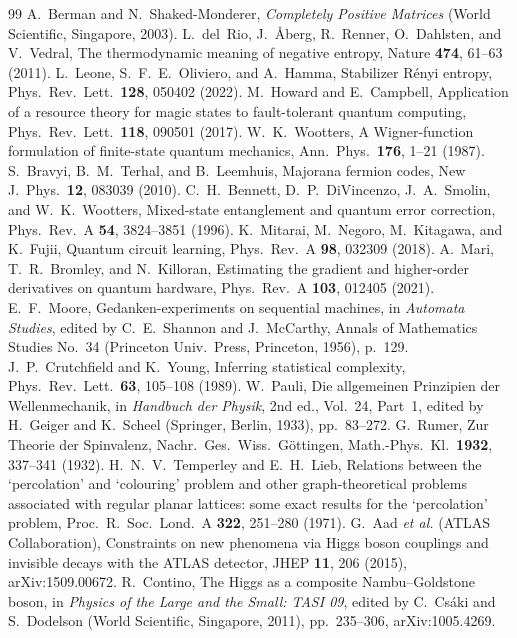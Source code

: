 \documentclass[aps,pra,onecolumn,superscriptaddress,nofootinbib,10pt]{revtex4-2}
\theoremstyle{definition}
\theoremstyle{remark}
\begin{document}
\begin{thebibliography}{99}
 A.~Berman and N.~Shaked-Monderer, \emph{Completely Positive Matrices} (World Scientific, Singapore, 2003).
 L.~del~Rio, J.~{\AA}berg, R.~Renner, O.~Dahlsten, and V.~Vedral, The thermodynamic meaning of negative entropy, Nature \textbf{474}, 61--63 (2011).
 L.~Leone, S.~F.~E.~Oliviero, and A.~Hamma, Stabilizer R\'enyi entropy, Phys.\ Rev.\ Lett.\ \textbf{128}, 050402 (2022).
 M.~Howard and E.~Campbell, Application of a resource theory for magic states to fault-tolerant quantum computing, Phys.\ Rev.\ Lett.\ \textbf{118}, 090501 (2017).
 W.~K.~Wootters, A Wigner-function formulation of finite-state quantum mechanics, Ann.\ Phys.\ \textbf{176}, 1--21 (1987).
 S.~Bravyi, B.~M.~Terhal, and B.~Leemhuis, Majorana fermion codes, New J.\ Phys.\ \textbf{12}, 083039 (2010).
 C.~H.~Bennett, D.~P.~DiVincenzo, J.~A.~Smolin, and W.~K.~Wootters, Mixed-state entanglement and quantum error correction, Phys.\ Rev.\ A \textbf{54}, 3824--3851 (1996).
 K.~Mitarai, M.~Negoro, M.~Kitagawa, and K.~Fujii, Quantum circuit learning, Phys.\ Rev.\ A \textbf{98}, 032309 (2018).
 A.~Mari, T.~R.~Bromley, and N.~Killoran, Estimating the gradient and higher-order derivatives on quantum hardware, Phys.\ Rev.\ A \textbf{103}, 012405 (2021).
 E.~F.~Moore, Gedanken-experiments on sequential machines, in \emph{Automata Studies}, edited by C.~E.~Shannon and J.~McCarthy, Annals of Mathematics Studies No.~34 (Princeton Univ.\ Press, Princeton, 1956), p.~129.
 J.~P.~Crutchfield and K.~Young, Inferring statistical complexity, Phys.\ Rev.\ Lett.\ \textbf{63}, 105--108 (1989).
 W.~Pauli, Die allgemeinen Prinzipien der Wellenmechanik, in \emph{Handbuch der Physik}, 2nd ed., Vol.~24, Part~1, edited by H.~Geiger and K.~Scheel (Springer, Berlin, 1933), pp.~83--272.
 G.~Rumer, Zur Theorie der Spinvalenz, Nachr.\ Ges.\ Wiss.\ G\"ottingen, Math.-Phys.\ Kl.\ \textbf{1932}, 337--341 (1932).
 H.~N.~V.~Temperley and E.~H.~Lieb, Relations between the `percolation' and `colouring' problem and other graph-theoretical problems associated with regular planar lattices: some exact results for the `percolation' problem, Proc.\ R.\ Soc.\ Lond.\ A \textbf{322}, 251--280 (1971).
 G.~Aad \emph{et al.} (ATLAS Collaboration), Constraints on new phenomena via Higgs boson couplings and invisible decays with the ATLAS detector, JHEP \textbf{11}, 206 (2015), arXiv:1509.00672.
 R.~Contino, The Higgs as a composite Nambu--Goldstone boson, in \emph{Physics of the Large and the Small: TASI 09}, edited by C.~Cs\'aki and S.~Dodelson (World Scientific, Singapore, 2011), pp.~235--306, arXiv:1005.4269.
\end{thebibliography}
\end{document}
